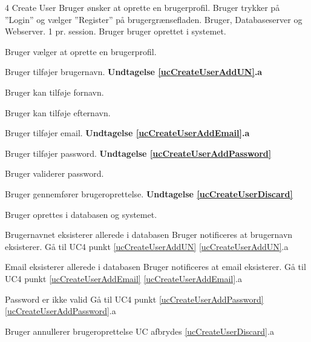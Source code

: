 
\uchead
	{4}
	{Create User}
	{Bruger ønsker at oprette en brugerprofil.}
	{Bruger trykker på ''Login'' og vælger ''Register'' på brugergrænsefladen.}
	{Bruger, Databaseserver og Webserver.}
	{}
	{1 pr. session.}
	{Bruger bruger oprettet i systemet.}

\item \label{ucCreateUserOptions} Bruger vælger at oprette en brugerprofil.

\item \label{ucCreateUserAddUN} Bruger tilføjer brugernavn.
\textbf{Undtagelse \ref{ucCreateUserAddUN}.a}

\item Bruger kan tilføje fornavn.
\item Bruger kan tilføje efternavn.

\item \label{ucCreateUserAddEmail} Bruger tilføjer email.
\textbf{Undtagelse \ref{ucCreateUserAddEmail}.a}

\item Bruger tilføjer password.
\textbf{Undtagelse \ref{ucCreateUserAddPassword}}

\item Bruger validerer password.

\item Bruger gennemfører brugeroprettelse.
\textbf{Undtagelse \ref{ucCreateUserDiscard}}

\item \label{ucCreateUserCreated} Bruger oprettes i databasen og systemet.

\ucdescriptionend



\ucextension
	{Brugernavnet eksisterer allerede i databasen}
	{Bruger notificeres at brugernavn eksisterer.\newline
	Gå til UC4 punkt \ref{ucCreateUserAddUN}}
	{\ref{ucCreateUserAddUN}.a}
	


\ucextension
	{Email eksisterer allerede i databasen}
	{Bruger notificeres at email eksisterer.\newline
	Gå til UC4 punkt \ref{ucCreateUserAddEmail}}
	{\ref{ucCreateUserAddEmail}.a}


\ucextension
	{Password er ikke valid}
	{Gå til UC4 punkt \ref{ucCreateUserAddPassword}}
	{\ref{ucCreateUserAddPassword}.a}

\ucextension
	{Bruger annullerer brugeroprettelse}
	{UC afbrydes}
	{\ref{ucCreateUserDiscard}.a}
			
